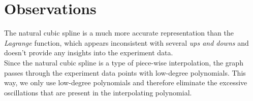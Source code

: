 \documentclass{article}
\begin{document}
\section{Observations}
The natural cubic spline is a much more accurate representation than the {\it Lagrange} function, which appears inconsistent with several {\it ups and downs} and doesn't provide any insights into the experiment data.\\

Since the natural cubic spline is a type of piece-wise interpolation, the graph passes through the experiment data points with low-degree polynomials. This way, we only use low-degree polynomials and therefore eliminate the excessive oscillations that are present in the interpolating polynomial.\\

\end{document}
